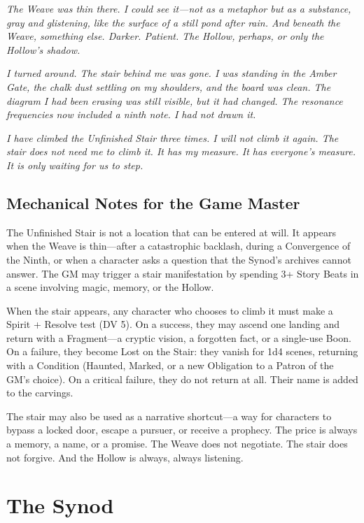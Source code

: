 \documentclass[10pt,twocolumn]{book}
\begin{document}
\begin{tcolorbox}[colback=black!5,colframe=black!30,width=\linewidth,arc=2mm,auto outer arc,boxrule=0.5pt,left=0.5cm,right=0.5cm,fontupper=\itshape,breakable]
\textit{The Weave was thin there. I could see it---not as a metaphor but as a substance, gray and glistening, like the surface of a still pond after rain. And beneath the Weave, something else. Darker. Patient. The Hollow, perhaps, or only the Hollow's shadow.}

\textit{I turned around. The stair behind me was gone. I was standing in the Amber Gate, the chalk dust settling on my shoulders, and the board was clean. The diagram I had been erasing was still visible, but it had changed. The resonance frequencies now included a ninth note. I had not drawn it.}

\textit{I have climbed the Unfinished Stair three times. I will not climb it again. The stair does not need me to climb it. It has my measure. It has everyone's measure. It is only waiting for us to step.}
\end{tcolorbox}

\subsection{Mechanical Notes for the Game Master}

The Unfinished Stair is not a location that can be entered at will. It appears when the Weave is thin---after a catastrophic backlash, during a Convergence of the Ninth, or when a character asks a question that the Synod's archives cannot answer. The GM may trigger a stair manifestation by spending 3+ Story Beats in a scene involving magic, memory, or the Hollow.

When the stair appears, any character who chooses to climb it must make a Spirit + Resolve test (DV 5). On a success, they may ascend one landing and return with a Fragment---a cryptic vision, a forgotten fact, or a single-use Boon. On a failure, they become Lost on the Stair: they vanish for 1d4 scenes, returning with a Condition (Haunted, Marked, or a new Obligation to a Patron of the GM's choice). On a critical failure, they do not return at all. Their name is added to the carvings.

The stair may also be used as a narrative shortcut---a way for characters to bypass a locked door, escape a pursuer, or receive a prophecy. The price is always a memory, a name, or a promise. The Weave does not negotiate. The stair does not forgive. And the Hollow is always, always listening.

\section{The Synod}
\end{document}
